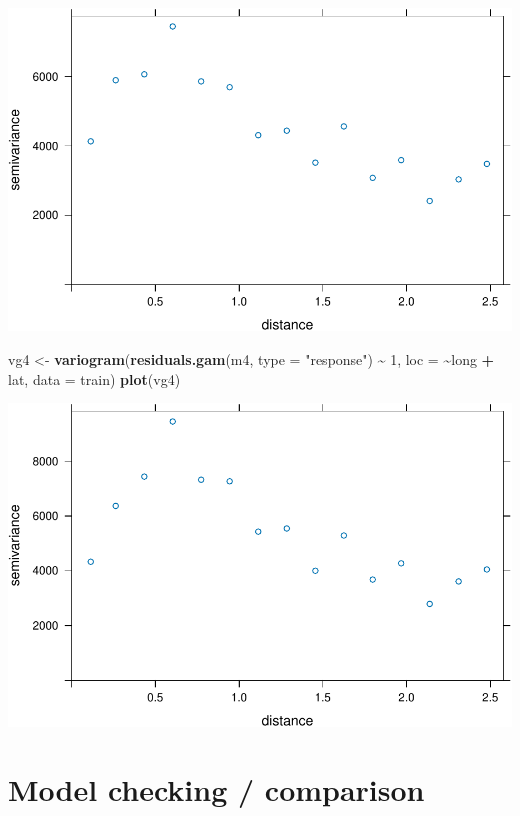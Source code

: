 \documentclass[
]{book}
\newenvironment{Shaded}{\begin{snugshade}}{\end{snugshade}}
\newcommand{\AttributeTok}[1]{\textcolor[rgb]{0.13,0.29,0.53}{#1}}
\newcommand{\DecValTok}[1]{\textcolor[rgb]{0.00,0.00,0.81}{#1}}
\newcommand{\FunctionTok}[1]{\textcolor[rgb]{0.13,0.29,0.53}{\textbf{#1}}}
\newcommand{\NormalTok}[1]{#1}
\newcommand{\OtherTok}[1]{\textcolor[rgb]{0.56,0.35,0.01}{#1}}
\newcommand{\SpecialCharTok}[1]{\textcolor[rgb]{0.81,0.36,0.00}{\textbf{#1}}}
\newcommand{\StringTok}[1]{\textcolor[rgb]{0.31,0.60,0.02}{#1}}
\begin{document}
\includegraphics{_main_files/figure-latex/unnamed-chunk-35-3.pdf}

\begin{Shaded}
\begin{Highlighting}[]
\NormalTok{vg4 }\OtherTok{\textless{}{-}} \FunctionTok{variogram}\NormalTok{(}\FunctionTok{residuals.gam}\NormalTok{(m4, }\AttributeTok{type =} \StringTok{"response"}\NormalTok{) }\SpecialCharTok{\textasciitilde{}} \DecValTok{1}\NormalTok{, }\AttributeTok{loc =} \SpecialCharTok{\textasciitilde{}}\NormalTok{long }\SpecialCharTok{+}
\NormalTok{                  lat, }\AttributeTok{data =}\NormalTok{ train)}
\FunctionTok{plot}\NormalTok{(vg4)}
\end{Highlighting}
\end{Shaded}

\includegraphics{_main_files/figure-latex/unnamed-chunk-35-4.pdf}

\hypertarget{model-checking-comparison}{%
\chapter{Model checking / comparison}\label{model-checking-comparison}}
\end{document}
